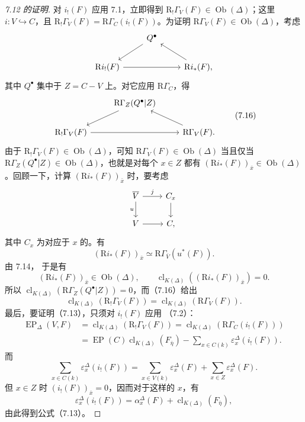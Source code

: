 \begin{proof}[7.12 的证明]
对 $i_!(F)$ 应用 7.1，立即得到 $\mathrm R_!\Gamma_V(F)\in\operatorname{Ob}(\Delta)$；这里 $i:V\hookrightarrow C$，且
$\mathrm R_!\Gamma_V(F)=\mathrm R\Gamma_C(i_!(F))$。为证明 $\mathrm R\Gamma_V(F)\in\operatorname{Ob}(\Delta)$，考虑
\[
\begin{tikzcd}
&Q^\bullet\arrow[dl]&\\
\mathrm Ri_!(F)\arrow[rr]&&\mathrm Ri_*(F)\arrow[ul],
\end{tikzcd}
\]
其中 $Q^\bullet$ 集中于 $Z=C-V$ 上。对它应用 $\mathrm R\Gamma_C$，得
\[
\begin{tikzcd}
&\mathrm R\Gamma_Z(Q^\bullet|Z)\arrow[dl]&\\
\mathrm R_!\Gamma_V(F)\arrow[rr]&&\mathrm R\Gamma_V(F)\arrow[ul].
\end{tikzcd}\tag{7.16}
\]
由于 $\mathrm R_!\Gamma_V(F)\in\operatorname{Ob}(\Delta)$，可知 $\mathrm R\Gamma_V(F)\in\operatorname{Ob}(\Delta)$ 当且仅当 $\mathrm R\Gamma_Z(Q^\bullet|Z)\in\operatorname{Ob}(\Delta)$，也就是对每个 $x\in Z$ 都有 $(\mathrm Ri_*(F))_{\bar x}\in\operatorname{Ob}(\Delta)$。回顾一下，计算 $(\mathrm Ri_*(F))_{\bar x}$ 时，要考虑
\[
\begin{tikzcd}
\overline V\arrow[r,"j"]\arrow[d,"u"']&C_x\arrow[d]\\
V\arrow[r]&C,
\end{tikzcd}
\]
其中 $C_x$ 为对应于 $x$ 的。有
\[
(\mathrm Ri_*(F))_{\bar x}\simeq\mathrm R\Gamma_{\overline V}(u^*(F)).
\]
由 7.14，
于是有
\[
(\mathrm Ri_*(F))_{\bar x}\in\operatorname{Ob}(\Delta),\qquad
\operatorname{cl}_{K(\Delta)}((\mathrm Ri_*(F))_{\bar x})=0.
\]
所以 $\operatorname{cl}_{K(\Delta)}(\mathrm R\Gamma_Z(Q^\bullet|Z))=0$，而（7.16）给出
\[
\operatorname{cl}_{K(\Delta)}(\mathrm R_!\Gamma_V(F))
=\operatorname{cl}_{K(\Delta)}(\mathrm R\Gamma_V(F)).
\]
最后，要证明（7.13），只须对 $i_!(F)$ 应用 （7.2）：
\[
\begin{aligned}
\operatorname{EP}_\Delta(V,F)
&=\operatorname{cl}_{K(\Delta)}(\mathrm R_!\Gamma_V(F))
=\operatorname{cl}_{K(\Delta)}(\mathrm R\Gamma_C(i_!(F)))\\
&=\operatorname{EP}(C)\operatorname{cl}_{K(\Delta)}(F_{\bar\eta})
-\sum_{x\in C(k)}\varepsilon_x^\Delta(i_!(F)).
\end{aligned}
\]
而
\[
\sum_{x\in C(k)}\varepsilon_x^\Delta(i_!(F))
=\sum_{x\in V(k)}\varepsilon_x^\Delta(F)
+\sum_{x\in Z}\varepsilon_x^\Delta(F).
\]
但 $x\in Z$ 时 $(i_!(F))_{\bar x}=0$，因而对于这样的 $x$，有
\[
\varepsilon_x^\Delta(i_!(F))
=\alpha_x^\Delta(F)+\operatorname{cl}_{K(\Delta)}(F_{\bar\eta}),
\]
由此得到公式（7.13）。
\end{proof}

